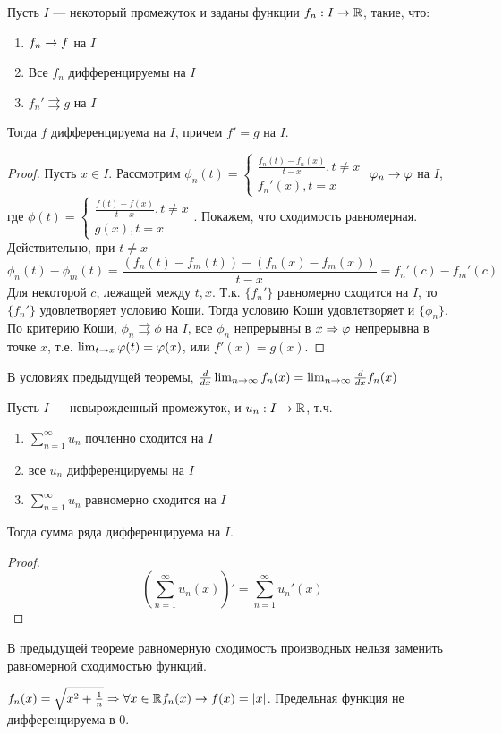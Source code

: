 \begin{theorem}
    Пусть \(I\) --- некоторый промежуток и заданы функции \(f_n: I \rightarrow \mathbb{R}\), такие, что:
    \begin{enumerate}
        \item \(f_n \rightarrow f\) на \(I\)
        \item Все \(f_n\) дифференцируемы на \(I\)
        \item \(f_n' \rightrightarrows g\) на \(I\)
    \end{enumerate}
    Тогда \(f\) дифференцируема на \(I\), причем \(f' = g\) на \(I\).
\end{theorem}
\begin{proof}
    Пусть \(x \in I\). Рассмотрим \(\phi_n(t) = \left\{\begin{array}{l}
        \frac{f_n(t) - f_n(x)}{t - x} , t \ne x \\
        f_n'(x), t = x
    \end{array}\right.\)
    \(\varphi_n \rightarrow \varphi\) на \(I\), где \(\phi(t) = \left\{\begin{array}{l}
        \frac{f(t) - f(x)}{t - x}, t \ne x \\
        g(x), t = x
    \end{array}\right.\). Покажем, что сходимость равномерная. Действительно, при \(t \ne x\)
    \[\phi_n(t) - \phi_m(t) = \frac{(f_n(t) - f_m(t)) - (f_n(x) - f_m(x))}{t - x} = f_n'(c) - f_m'(c)\]
    Для некоторой \(c\), лежащей между \(t, x\). Т.к. \(\{f_n'\}\) равномерно сходится на \(I\), то \(\{f_n'\}\) удовлетворяет условию Коши. Тогда условию Коши удовлетворяет и \(\{\phi_n\}\). По критерию Коши, \(\phi_n \rightrightarrows \phi\) на \(I\), все \(\phi_n\) непрерывны в \(x \Rightarrow \varphi\) непрерывна в точке \(x\), т.е. \(\lim_{t \rightarrow x} \varphi(t) = \varphi(x)\), или \(f'(x) = g(x)\).
\end{proof}

\begin{note}
    В условиях предыдущей теоремы,  \(\frac{d}{dx}\lim_{n \rightarrow \infty} f_n(x) = \lim_{n \rightarrow \infty}\frac{d}{dx}f_n(x)\)
\end{note}

\begin{corollary}
    Пусть \(I\) --- невырожденный промежуток, и \(u_n: I \rightarrow \mathbb{R}\), т.ч.
    \begin{enumerate}
        \item \(\sum_{n = 1}^\infty u_n\) почленно сходится на \(I\)
        \item все \(u_n\) дифференцируемы на \(I\)
        \item \(\sum_{n = 1}^\infty u_n\) равномерно сходится на \(I\)
    \end{enumerate}
    Тогда сумма ряда дифференцируема на \(I\).
\end{corollary}
\begin{proof}
    \[\left(\sum_{n = 1}^\infty u_n(x)\right)' = \sum_{n = 1}^\infty u_n'(x)\]
\end{proof}

\begin{note}
    В предыдущей теореме равномерную сходимость производных нельзя заменить равномерной сходимостью функций.
\end{note}
\begin{example}
    \(f_n(x) = \sqrt{x^2 + \frac{1}{n}} \Rightarrow \forall x \in \mathbb{R} f_n(x) \rightarrow f(x) = |x|\). Предельная функция не дифференцируема в \(0\).
\end{example}